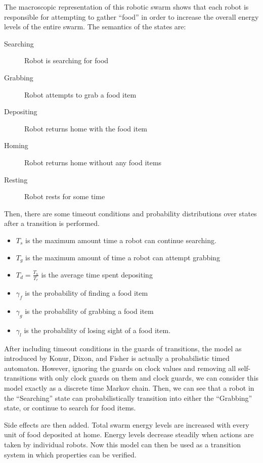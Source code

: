 \documentclass[11pt]{article}
\theoremstyle{definition}
\begin{document}
The macroscopic representation of this robotic swarm
shows that each robot is responsible for attempting
to gather ``food'' in order to increase the overall
energy levels of the entire swarm. The semantics
of the states are:

\begin{description}
    \item[Searching] Robot is searching for food
    \item[Grabbing] Robot attempts to grab a food item
    \item[Depositing] Robot returns home with the food item
    \item[Homing] Robot returns home without any food items
    \item[Resting] Robot rests for some time
\end{description}

Then, there are some timeout conditions and probability
distributions over states after a transition is performed.

\begin{itemize}
    \item $ T_s $ is the maximum amount time a robot can continue searching.
    \item $ T_g $ is the maximum amount of time a robot can attempt
        grabbing
    \item $ T_d = \frac{T_h}{T_r} $ is the average time spent depositing
    \item $ \gamma_f $ is the probability of finding a food item
    \item $ \gamma_g $ is the probability of grabbing a food item
    \item $ \gamma_l $ is the probability of losing sight of a food
        item.
\end{itemize}

After including timeout conditions in the guards
of transitions, the model as introduced by Konur, Dixon, and
Fisher is actually a probabilistic timed automaton. However,
ignoring the guards on clock values and removing all self-transitions
with only clock guards on them and clock guards, we can consider this model
exactly as a discrete time Markov chain. Then, we can see
that a robot in the ``Searching'' state can probabilistically
transition into either the ``Grabbing'' state, or continue to
search for food items.

Side effects are then added. Total swarm energy levels are increased
with every unit of food deposited at home. Energy levels decrease
steadily when actions are taken by individual
robots. Now this model can then be used as a transition system in
which properties can be verified.
\end{document}
